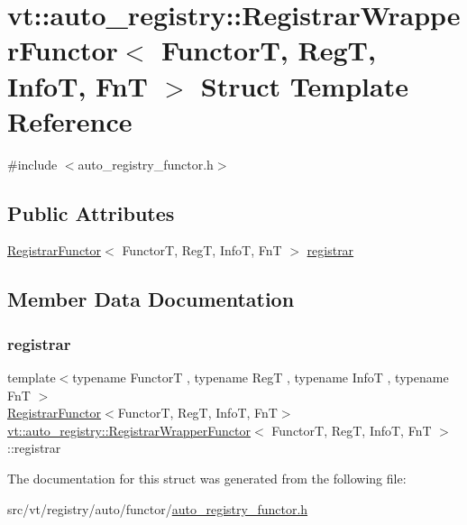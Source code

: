 \hypertarget{structvt_1_1auto__registry_1_1_registrar_wrapper_functor}{}\section{vt\+:\+:auto\+\_\+registry\+:\+:Registrar\+Wrapper\+Functor$<$ FunctorT, RegT, InfoT, FnT $>$ Struct Template Reference}
\label{structvt_1_1auto__registry_1_1_registrar_wrapper_functor}


{\ttfamily \#include $<$auto\+\_\+registry\+\_\+functor.\+h$>$}

\subsection*{Public Attributes}
\begin{DoxyCompactItemize}
\item 
\hyperlink{structvt_1_1auto__registry_1_1_registrar_functor}{Registrar\+Functor}$<$ FunctorT, RegT, InfoT, FnT $>$ \hyperlink{structvt_1_1auto__registry_1_1_registrar_wrapper_functor_a637c66e11e7a955e7e57b03048f78a6d}{registrar}
\end{DoxyCompactItemize}


\subsection{Member Data Documentation}
\mbox{\label{structvt_1_1auto__registry_1_1_registrar_wrapper_functor_a637c66e11e7a955e7e57b03048f78a6d}} 
\subsubsection{\texorpdfstring{registrar}{registrar}}
{\footnotesize\ttfamily template$<$typename FunctorT , typename RegT , typename InfoT , typename FnT $>$ \\
\hyperlink{structvt_1_1auto__registry_1_1_registrar_functor}{Registrar\+Functor}$<$FunctorT, RegT, InfoT, FnT$>$ \hyperlink{structvt_1_1auto__registry_1_1_registrar_wrapper_functor}{vt\+::auto\+\_\+registry\+::\+Registrar\+Wrapper\+Functor}$<$ FunctorT, RegT, InfoT, FnT $>$\+::registrar}



The documentation for this struct was generated from the following file\+:\begin{DoxyCompactItemize}
\item 
src/vt/registry/auto/functor/\hyperlink{auto__registry__functor_8h}{auto\+\_\+registry\+\_\+functor.\+h}\end{DoxyCompactItemize}
